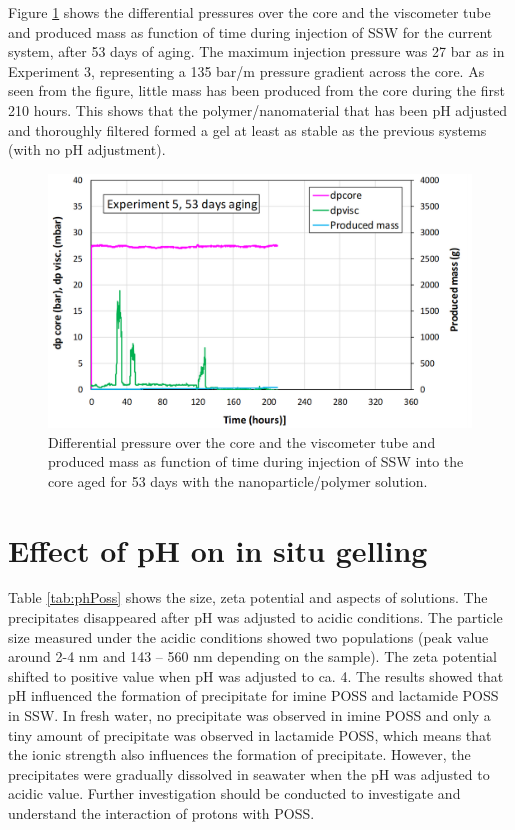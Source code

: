 Figure \ref{cht:gelexp5_2} shows the differential pressures over the core and the viscometer tube and produced mass as function of time during injection of SSW for the current system, after 53 days of aging.  The maximum injection pressure was 27 bar as in Experiment 3, representing a 135 bar/m pressure gradient across the core. As seen from the figure, little mass has been produced from the core during the first 210 hours. This shows that the polymer/nanomaterial that has been pH adjusted and thoroughly filtered formed a gel at least as stable as the previous systems (with no pH adjustment). 
\begin{figure}[h!]
    \centering
    \includegraphics[width=\textwidth]{img/cht/gelexp5_2.png}
    \caption{Differential pressure over the core and the viscometer tube and produced mass as function of time during injection of SSW into the core aged for 53 days with the nanoparticle/polymer solution.}
    \label{cht:gelexp5_2} %
\end{figure}

\FloatBarrier
\section{Effect of pH on in situ gelling \label{sec:phInSitu}}

Table \ref{tab:phPoss} shows the size, zeta potential and aspects of solutions. The precipitates disappeared after pH was adjusted to acidic conditions. The particle size measured under the acidic conditions showed two populations (peak value around 2-4 nm and 143 – 560 nm depending on the sample). The zeta potential shifted to positive value when pH was adjusted to ca. 4.  The results showed that pH influenced the formation of precipitate for imine POSS and lactamide POSS in SSW. In fresh water, no precipitate was observed in imine POSS and only a tiny amount of precipitate was observed in lactamide POSS, which means that the ionic strength also influences the formation of precipitate. However, the precipitates were gradually dissolved in seawater when the pH was adjusted to acidic value.  Further investigation should be conducted to investigate and understand the interaction of protons with POSS.

